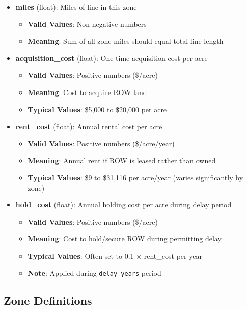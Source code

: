 \documentclass[ctcc_full_documentation.tex]{subfiles}
\begin{document}
\begin{itemize}
    \item \textbf{miles} (float): Miles of line in this zone
    \begin{itemize}
        \item \textbf{Valid Values}: Non-negative numbers
        \item \textbf{Meaning}: Sum of all zone miles should equal total line length
    \end{itemize}
    
    \item \textbf{acquisition\_cost} (float): One-time acquisition cost per acre
    \begin{itemize}
        \item \textbf{Valid Values}: Positive numbers (\$/acre)
        \item \textbf{Meaning}: Cost to acquire ROW land
        \item \textbf{Typical Values}: \$5,000 to \$20,000 per acre
    \end{itemize}
    
    \item \textbf{rent\_cost} (float): Annual rental cost per acre
    \begin{itemize}
        \item \textbf{Valid Values}: Positive numbers (\$/acre/year)
        \item \textbf{Meaning}: Annual rent if ROW is leased rather than owned
        \item \textbf{Typical Values}: \$9 to \$31,116 per acre/year (varies significantly by zone)
    \end{itemize}
    
    \item \textbf{hold\_cost} (float): Annual holding cost per acre during delay period
    \begin{itemize}
        \item \textbf{Valid Values}: Positive numbers (\$/acre)
        \item \textbf{Meaning}: Cost to hold/secure ROW during permitting delay
        \item \textbf{Typical Values}: Often set to 0.1 × rent\_cost per year
        \item \textbf{Note}: Applied during \texttt{delay\_years} period
    \end{itemize}
\end{itemize}

\subsection{Zone Definitions}
\end{document}
